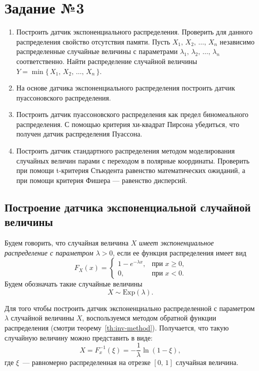 \section{Задание №3}

\begin{enumerate}
        \item Построить датчик экспоненциального распределения. 
        Проверить для данного распределения свойство отсутствия памяти. Пусть $X_1,\,X_2,\,\ldots,\,X_n$ независимо распределенные случайные величины с параметрами $\lambda_1,\,\lambda_2,\,\ldots,\,\lambda_n$ соответственно. 
        Найти распределение случайной величины $Y = \min\{\,X_1,\,X_2,\,\ldots,\,X_n\,\}$.
        \item На основе датчика экспоненциального распределения построить датчик пуассоновского распределения.
        \item Построить датчик пуассоновского распределения как предел биномеального распределения.
        С помощью критерия хи-квадрат Пирсона убедиться, что получен датчик распределения Пуассона.
        \item Построить датчик стандартного распределения методом моделирования случайных величин парами с переходом в полярные координаты. Проверить при помощи t-критерия Стьюдента равенство математических ожиданий, а при помощи критерия Фишера --- равенство дисперсий.
\end{enumerate}


\subsection{Построение датчика экспоненциальной случайной величины}

\begin{definition}
        Будем говорить, что случайная величина $X$ \textit{имеет экспоненциальное распределение с параметром $\lambda > 0$}, если ее функция распределения имеет вид
$$
        F_X(x) = 
        \begin{cases}
                1 - e^{-\lambda x},& \mbox{при $x \geqslant 0$,} \\
                0, & \mbox{при $x < 0$.}
        \end{cases}
$$
        Будем обозначать такие случайные величины
$$
        X \sim \mbox{Exp}(\lambda).
$$
\end{definition}

Для того чтобы построить датчик экспоненциально распределенной с параметром $\lambda$ случайной величины $X$, воспользуемся методом обратной функции распределения (смотри теорему~\ref{th:inv-method}). Получается, что такую случайную величину можно представить в виде:
$$
        X =
        F_x^{-1}(\xi) =
        -\frac{1}{\lambda}\ln(1 - \xi),
$$
где $\xi$~--- равномерно распределенная на отрезке $[0,\,1]$ случайная величина.


